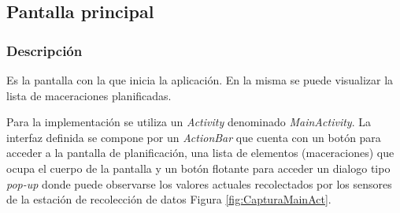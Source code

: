     \subsection{Pantalla principal}
        \label{DescripPantallaPrincipal}
        
            \subsubsection{Descripción}
                \par Es la pantalla con la que inicia la aplicación. En la misma se puede visualizar la lista de maceraciones planificadas.
                
                \par Para la implementación se utiliza un \textit{Activity} denominado \textit{MainActivity}. La interfaz definida se compone por un \textit{ActionBar} que cuenta con un botón para acceder a la pantalla de planificación, una lista de elementos (maceraciones) que ocupa el cuerpo de la pantalla y un botón flotante para acceder un dialogo tipo \textit{pop-up} donde puede observarse los valores actuales recolectados por los sensores de la estación de recolección de datos Figura \ref{fig:CapturaMainAct}. 
                
